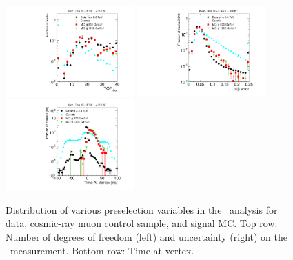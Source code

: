 \begin{figure}
\centering
  \includegraphics[clip=true, trim=0.0cm 0cm 2.8cm 0cm, width=0.44\textwidth]{figures/muonly/Selection_Comp_8TeV_Cosmic_nDof_BS}
  \includegraphics[clip=true, trim=0.0cm 0cm 2.8cm 0cm, width=0.44\textwidth]{figures/muonly/Selection_Comp_8TeV_Cosmic_TOFError_BS} \\
  \includegraphics[clip=true, trim=0.0cm 0cm 2.8cm 0cm, width=0.44\textwidth]{figures/muonly/Selection_Comp_8TeV_Cosmic_TimeAtIP_BS} \\
\caption[Distribution of number of degrees of freedom (left) and uncertainty (right) on the \invbeta\ measurement and time at vertex in 
the \muononly\ analysis for data, cosmic-ray muon control sample, and signal MC.]
{Distribution of various preselection variables in the \muononly\ analysis for data, cosmic-ray muon control sample, and signal MC.
Top row: Number of degrees of freedom (left) and uncertainty (right) on the \invbeta\ measurement.
Bottom row: Time at vertex.}
    \label{fig:MuOnlyPreselB}
\end{figure}

